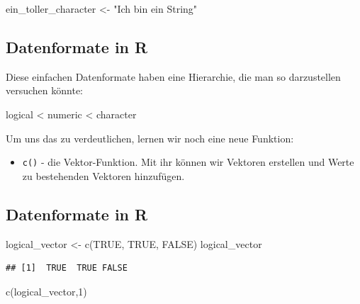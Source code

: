 \documentclass[
]{book}
\newenvironment{Shaded}{\begin{snugshade}}{\end{snugshade}}
\newcommand{\ConstantTok}[1]{\textcolor[rgb]{0.00,0.00,0.00}{#1}}
\newcommand{\DecValTok}[1]{\textcolor[rgb]{0.00,0.00,0.81}{#1}}
\newcommand{\FunctionTok}[1]{\textcolor[rgb]{0.00,0.00,0.00}{#1}}
\newcommand{\NormalTok}[1]{#1}
\newcommand{\OtherTok}[1]{\textcolor[rgb]{0.56,0.35,0.01}{#1}}
\newcommand{\StringTok}[1]{\textcolor[rgb]{0.31,0.60,0.02}{#1}}
\providecommand{\tightlist}{%
  \setlength{\itemsep}{0pt}\setlength{\parskip}{0pt}}
\begin{document}
\begin{Shaded}
\begin{Highlighting}[]
\NormalTok{ein\_toller\_character }\OtherTok{\textless{}{-}} \StringTok{"Ich bin ein String"}
\end{Highlighting}
\end{Shaded}

\hypertarget{datenformate-in-r-2}{%
\subsection{Datenformate in R}\label{datenformate-in-r-2}}

Diese einfachen Datenformate haben eine Hierarchie, die man so darzustellen versuchen könnte:

logical \textless{} numeric \textless{} character

Um uns das zu verdeutlichen, lernen wir noch eine neue Funktion:

\begin{itemize}
\tightlist
\item
  \texttt{c()} - die Vektor-Funktion. Mit ihr können wir Vektoren erstellen und Werte zu bestehenden Vektoren hinzufügen.
\end{itemize}

\hypertarget{datenformate-in-r-3}{%
\subsection{Datenformate in R}\label{datenformate-in-r-3}}

\begin{Shaded}
\begin{Highlighting}[]
\NormalTok{logical\_vector }\OtherTok{\textless{}{-}} \FunctionTok{c}\NormalTok{(}\ConstantTok{TRUE}\NormalTok{, }\ConstantTok{TRUE}\NormalTok{, }\ConstantTok{FALSE}\NormalTok{)}
\NormalTok{logical\_vector}
\end{Highlighting}
\end{Shaded}

\begin{verbatim}
## [1]  TRUE  TRUE FALSE
\end{verbatim}

\begin{Shaded}
\begin{Highlighting}[]
\FunctionTok{c}\NormalTok{(logical\_vector,}\DecValTok{1}\NormalTok{)}
\end{Highlighting}
\end{Shaded}
\end{document}
